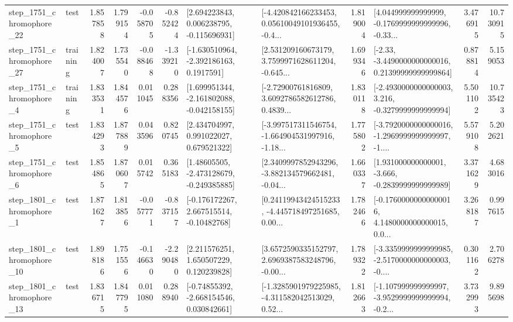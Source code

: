 \begin{tabular}{llrrrrllrlrr}
 step\_1751\_chromophore\_22 &      test &      1.857858 &    1.799154 &     -0.058705 & -0.852424 &    [2.694223843, 0.006238795, -0.115696931] &  [-4.420842166233453, 0.05610049101936455, -0.4... &       1.819004 &  [4.044999999999999, -0.1769999999999996, -0.33... &            3.476915 &         10.730915 \\
 step\_1751\_chromophore\_27 &  training &      1.824007 &    1.735540 &     -0.088468 & -1.339210 &     [-1.630510964, -2.392186163, 0.1917591] &  [2.531209160673179, 3.7599971628611204, -0.645... &       1.699346 &  [-2.33, -3.4490000000000016, 0.21399999999999864] &            0.878814 &          5.159053 \\
  step\_1751\_chromophore\_4 &  training &      1.833531 &    1.844576 &      0.011045 &  0.288356 &   [1.699951344, -2.161802088, -0.042158155] &  [-2.72900761816809, 3.6092786582612786, 0.4839... &       1.830118 &  [-2.4930000000000003, 3.216, -0.3279999999999994] &            5.501102 &         10.735423 \\
  step\_1751\_chromophore\_5 &      test &      1.834293 &    1.877889 &      0.043596 &  0.820745 &     [2.434704997, 0.991022027, 0.679521322] &  [-3.997517311546754, -1.664904531997916, -1.18... &       1.775802 &  [-3.7920000000000016, -1.2969999999999997, -1.... &            5.579108 &          5.202621 \\
  step\_1751\_chromophore\_6 &      test &      1.854865 &    1.870607 &      0.015742 &  0.365183 &    [1.48605505, -2.473128679, -0.249385885] &  [2.3409997852943296, -3.882134579662481, -0.04... &       1.660337 &   [1.931000000000001, -3.666, -0.2839999999999989] &            3.371629 &          4.683016 \\
  step\_1801\_chromophore\_1 &      test &      1.871627 &    1.813856 &     -0.057771 & -0.837157 &    [-0.176172267, 2.667515514, -0.10482768] &  [0.24119943424515233, -4.445718497251685, 0.00... &       1.782466 &  [-0.17600000000000016, 4.1480000000000015, 0.0... &            3.268187 &          0.997615 \\
 step\_1801\_chromophore\_10 &      test &      1.898186 &    1.751556 &     -0.146630 & -2.290480 &     [2.211576251, 1.650507229, 0.120239828] &  [3.6572590335152797, 2.6969387583248796, -0.00... &       1.789322 &  [-3.3359999999999985, -2.5170000000000003, -0.... &            0.301162 &          2.706278 \\
 step\_1801\_chromophore\_13 &      test &      1.836715 &    1.847795 &      0.011080 &  0.288940 &    [-0.74855392, -2.668154546, 0.030842661] &  [-1.3285901979225985, -4.311582042513029, 0.52... &       1.812663 &  [-1.107999999999997, -3.9529999999999994, -0.2... &            3.732993 &          9.895698 \\

\end{tabular}
